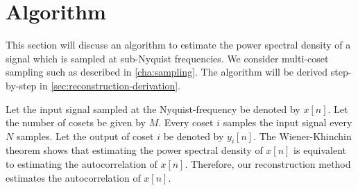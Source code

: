 \documentclass[a4paper, openany, oneside]{memoir}
\begin{document}
\section{Algorithm}
This section will discuss an algorithm to estimate the power spectral density of a signal which is sampled at sub-Nyquist frequencies. We consider multi-coset sampling such as described in \cref{cha:sampling}. The algorithm will be derived step-by-step in \cref{sec:reconstruction-derivation}.

Let the input signal sampled at the Nyquist-frequency be denoted by $x[n]$. Let the number of cosets be given by $M$. Every coset $i$ samples the input signal every $N$ samples. Let the output of coset $i$ be denoted by $y_i[n]$. The Wiener-Khinchin theorem shows that estimating the power spectral density of $x[n]$ is equivalent to estimating the autocorrelation of $x[n]$. Therefore, our reconstruction method estimates the autocorrelation of $x[n]$.







\end{document}
